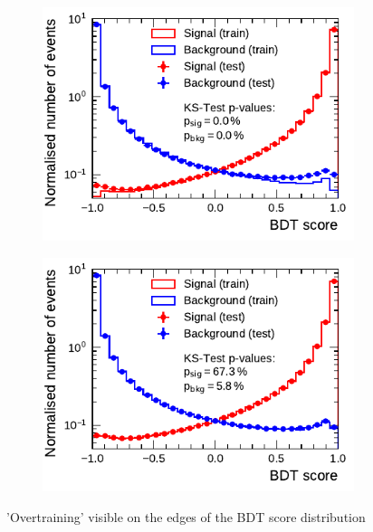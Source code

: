 \begin{figure}[ht]
  \begin{subfigure}[t]{0.48\textwidth}
    \centering
    \includegraphics{./figures/bdt_perf/scores/grid_1p0304.pdf}
  \end{subfigure}\hfill
  \begin{subfigure}[t]{0.48\textwidth}
    \centering
    \includegraphics{./figures/bdt_perf/scores/grid_1p_subsampling0269.pdf}
  \end{subfigure}
  \caption{'Overtraining' visible on the edges of the BDT score distribution}
  \label{fig:bdt_1p_scores}
\end{figure}


